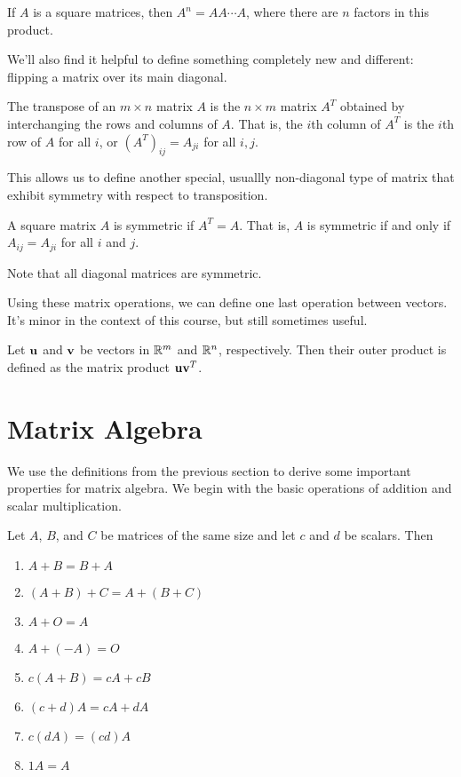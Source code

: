 \documentclass[../m73main.tex]{subfiles}
\begin{document}
\begin{definition}
	If $A$ is a square matrices, then $A^n = AA\cdots A$, where there are $n$ factors in this product.
\end{definition}

We'll also find it helpful to define something completely new and different: flipping a matrix over its main diagonal.

\begin{definition}
	The transpose of an $m\times n$ matrix $A$ is the $n\times m$ matrix $A^T$ obtained by interchanging the rows and columns of $A$.
	That is, the $i$th column of $A^T$ is the $i$th row of $A$ for all $i$, or $(A^T)_{ij} = A_{ji}$ for all $i, j$.
\end{definition}

This allows us to define another special, usuallly non-diagonal type of matrix that exhibit symmetry with respect to transposition.

\begin{definition}
	A square matrix $A$ is symmetric if $A^T = A$.
	That is, $A$ is symmetric if and only if $A_{ij} = A_{ji}$ for all $i$ and $j$.
\end{definition}

Note that all diagonal matrices are symmetric.

Using these matrix operations, we can define one last operation between vectors.
It's minor in the context of this course, but still sometimes useful.

\begin{definition}
	Let $\mathbf{u}$ and $\mathbf{v}$ be vectors in $\mathbb{R}^m$ and $\mathbb{R}^n$, respectively.
	Then their outer product is defined as the matrix product $\mathbf{u}\mathbf{v}^T$.
\end{definition}

\section{Matrix Algebra}
We use the definitions from the previous section to derive some important properties for matrix algebra.
We begin with the basic operations of addition and scalar multiplication.

\begin{theorem}
	Let $A$, $B$, and $C$ be matrices of the same size and let $c$ and $d$ be scalars.
	Then
	\begin{enumerate}[label=(\alph*)]
		\item $A + B = B + A$
		\item $(A + B) + C = A + (B + C)$
		\item $A + O = A$
		\item $A + (-A) = O$
		\item $c(A + B) = cA + cB$
		\item $(c+d)A = cA + dA$
		\item $c(dA) = (cd)A$
		\item $1A = A$
	\end{enumerate}
\end{theorem}
\end{document}
